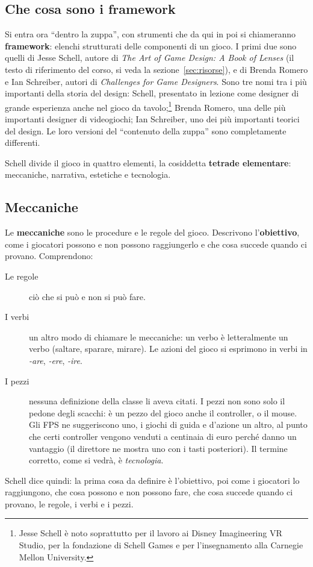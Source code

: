 \subsection{Che cosa sono i framework}

Si entra ora ``dentro la zuppa'', con strumenti che da qui in poi si chiameranno
\textbf{framework}: elenchi strutturati delle componenti di un gioco. I primi
due sono quelli di Jesse Schell, autore di \emph{The Art of Game Design: A Book
of Lenses} (il testo di riferimento del corso, si veda la
sezione~\ref{sec:risorse}), e di Brenda Romero e Ian Schreiber, autori di
\emph{Challenges for Game Designers}. Sono tre nomi tra i più importanti della
storia del design: Schell, presentato in lezione come designer di grande
esperienza anche nel gioco da tavolo;\footnote{Jesse Schell è noto soprattutto
per il lavoro ai Disney Imagineering VR Studio, per la fondazione di Schell
Games e per l'insegnamento alla Carnegie Mellon University.} Brenda Romero,
una delle più importanti designer di videogiochi; Ian Schreiber, uno dei più
importanti teorici del design. Le loro versioni del ``contenuto della zuppa''
sono completamente differenti.

Schell divide il gioco in quattro elementi, la cosiddetta \textbf{tetrade
elementare}: meccaniche, narrativa, estetiche e tecnologia.

\subsection{Meccaniche}

Le \textbf{meccaniche} sono le procedure e le regole del gioco. Descrivono
l'\textbf{obiettivo}, come i giocatori possono e non possono raggiungerlo e che
cosa succede quando ci provano. Comprendono:
\begin{description}
  \item[Le regole] ciò che si può e non si può fare.
  \item[I verbi] un altro modo di chiamare le meccaniche: un verbo è
        letteralmente un verbo (saltare, sparare, mirare). Le azioni del gioco
        si esprimono in verbi in \emph{-are}, \emph{-ere}, \emph{-ire}.
  \item[I pezzi] nessuna definizione della classe li aveva citati. I pezzi non
        sono solo il pedone degli scacchi: è un pezzo del gioco anche il
        controller, o il mouse. Gli FPS ne suggeriscono uno, i giochi di guida e
        d'azione un altro, al punto che certi controller vengono venduti a
        centinaia di euro perché danno un vantaggio (il direttore ne mostra uno
        con i tasti posteriori). Il termine corretto, come si vedrà, è
        \emph{tecnologia}.
\end{description}
Schell dice quindi: la prima cosa da definire è l'obiettivo, poi come i
giocatori lo raggiungono, che cosa possono e non possono fare, che cosa succede
quando ci provano, le regole, i verbi e i pezzi.

